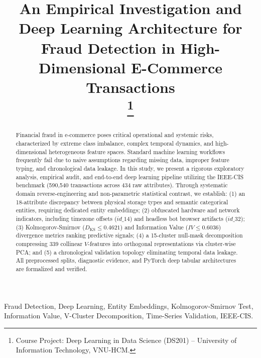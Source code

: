 \documentclass[conference]{IEEEtran}
\title{An Empirical Investigation and Deep Learning Architecture for Fraud Detection in High-Dimensional E-Commerce Transactions\\
\thanks{Course Project: Deep Learning in Data Science (DS201) -- University of Information Technology, VNU-HCM.}
}
\author{
\IEEEauthorblockN{Dinh Pham Anh Quan}
\IEEEauthorblockA{\textit{Faculty of Information Science and Engineering} \\
\textit{University of Information Technology, VNU-HCM}\\
Student ID: 24521425\\
Ho Chi Minh City, Vietnam}
}
\begin{document}
\maketitle

\begin{abstract}
Financial fraud in e-commerce poses critical operational and systemic risks, characterized by extreme class imbalance, complex temporal dynamics, and high-dimensional heterogeneous feature spaces. Standard machine learning workflows frequently fail due to naive assumptions regarding missing data, improper feature typing, and chronological data leakage. In this study, we present a rigorous exploratory analysis, empirical audit, and end-to-end deep learning pipeline utilizing the IEEE-CIS benchmark (590,540 transactions across 434 raw attributes). Through systematic domain reverse-engineering and non-parametric statistical contrast, we establish: (1) an 18-attribute discrepancy between physical storage types and semantic categorical entities, requiring dedicated entity embeddings; (2) obfuscated hardware and network indicators, including timezone offsets ($id\_14$) and headless bot browser artifacts ($id\_32$); (3) Kolmogorov-Smirnov ($D_{\text{KS}} \le 0.4621$) and Information Value ($IV \le 0.6036$) divergence metrics ranking predictive signals; (4) a 15-cluster null-mask decomposition compressing 339 collinear $V$-features into orthogonal representations via cluster-wise PCA; and (5) a chronological validation topology eliminating temporal data leakage. All preprocessed splits, diagnostic evidence, and PyTorch deep tabular architectures are formalized and verified.
\end{abstract}

\begin{IEEEkeywords}
Fraud Detection, Deep Learning, Entity Embeddings, Kolmogorov-Smirnov Test, Information Value, V-Cluster Decomposition, Time-Series Validation, IEEE-CIS.
\end{IEEEkeywords}

\end{document}
